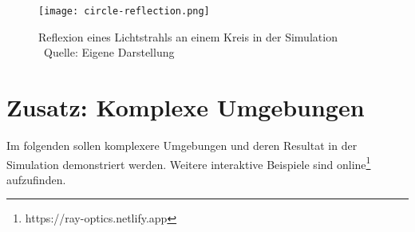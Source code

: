 
\begin{figure}
    \centering
    \texttt{[image: circle-reflection.png]}

    \caption{Reflexion eines Lichtstrahls an einem Kreis in der Simulation  \\ Quelle: Eigene Darstellung}

\end{figure}

\chapter*{Zusatz: Komplexe Umgebungen}
Im folgenden sollen komplexere Umgebungen und deren Resultat in der Simulation demonstriert werden. 
Weitere interaktive Beispiele sind online\footnote{https://ray-optics.netlify.app} aufzufinden.